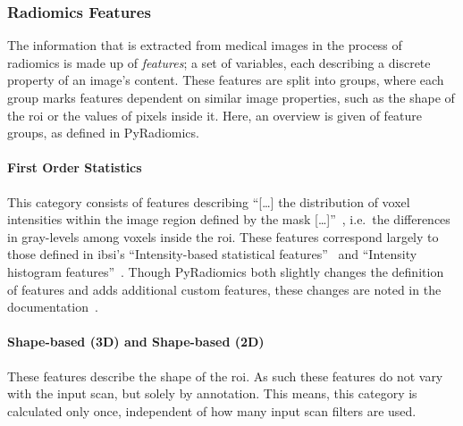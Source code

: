 
\subsubsection{Radiomics Features}\label{sec:radiomics_features}

The information that is extracted from medical images in the process of 
radiomics is made up of \textit{features};
a set of variables, each describing a discrete property of an image's content.
These features are split into groups, where each group marks features dependent 
on similar image properties, such as the shape of the \ac{roi} or the values of
pixels inside it. Here, an overview is given of feature groups, as defined in 
PyRadiomics.


\paragraph{First Order Statistics} This category consists of
features describing \enquote{[\dots] the distribution of voxel intensities within
the image region defined by the mask [\dots]}~\cite[First Order Features]{py_rad_docs}, %
i.e.~the differences in gray-levels among voxels inside the \ac{roi}. 
These features correspond largely to those defined in \ac{ibsi}'s \enquote{Intensity-based
statistical features}~\cite[\texttt{UHIW}]{ibsi_reference_manual} and 
\enquote{Intensity histogram features}~\cite[\texttt{ZVCW}]{ibsi_reference_manual}.
Though PyRadiomics both slightly changes the definition of features and adds 
additional custom features, these changes are noted in the 
documentation~\cite[First Order Features]{py_rad_docs}.

\paragraph{Shape-based (3D) and Shape-based (2D)} These features describe the 
shape of the \ac{roi}. As such these features do not vary with the input scan,
but solely by annotation. This means, this category is calculated only once, 
independent of how many input scan filters are used.


